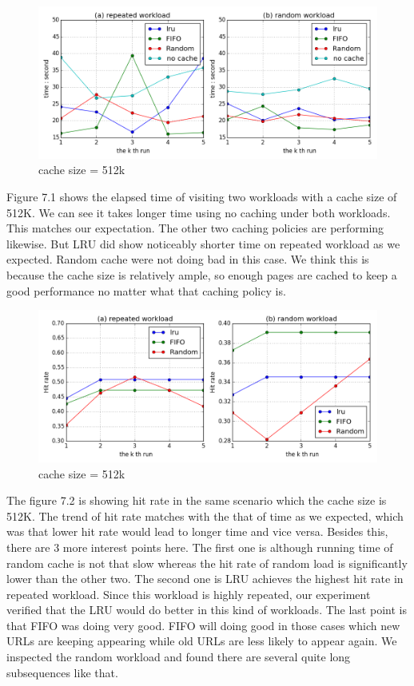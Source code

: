 \documentclass[paper=a4, fontsize=11pt]{scrartcl} %
\numberwithin{equation}{section} %
\numberwithin{figure}{section} %
\numberwithin{table}{section} %
\begin{document}
\begin{figure}[h]
  \centering
  \includegraphics[width=\textwidth]{../data/time512k}
  \caption{cache size = 512k}
  \label{fig:time512k}
\end{figure}
Figure 7.1 shows the elapsed time of visiting two workloads with a cache size of 512K. We can see it takes longer time using no caching under both workloads. This matches our expectation. The other two caching policies are performing likewise. But LRU did show noticeably shorter time on repeated workload as we expected. Random cache were not doing bad in this case. We think this is because the cache size is relatively ample, so enough pages are cached to keep a good performance no matter what that caching policy is. 
\begin{figure}[h]
  \centering
  \includegraphics[width=\textwidth]{../data/hit512k}
  \caption{cache size = 512k}
  \label{fig:hit512k}
\end{figure}
The figure 7.2 is showing hit rate in the same scenario which the cache size is 512K. The trend of hit rate matches with the that of time as we expected, which was that lower hit rate would lead to longer time and vice versa. Besides this, there are 3 more interest points here. The first one is although running time of random cache is not that slow whereas the hit rate of random load is significantly lower than the other two. The second one is LRU achieves the highest hit rate in repeated workload. Since this workload is highly repeated, our experiment verified that the LRU would do better in this kind of workloads. The last point is that FIFO was doing very good. FIFO will doing good in those cases which new URLs are keeping appearing while old URLs are less likely to appear again. We inspected the random workload and found there are several quite long subsequences like that.
\end{document}
